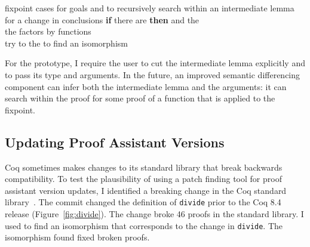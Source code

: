 \begin{algorithm}
\footnotesize
\begin{algorithmic}[1]
    \STATE {} fixpoint cases for goals
    \STATE {} and  to recursively search within an intermediate lemma for a change in conclusions
    \STATE \textbf{if} there are  \textbf{then}
    \STATE \hspace*{1em}  and  the  \\
           \hspace*{1em}  the factors by functions \\
           \hspace*{1em} try to  the  to find an isomorphism 
\end{algorithmic}
\end{algorithm}

For the prototype, I require the user to cut the intermediate lemma explicitly and to 
pass its type and arguments.
In the future, an improved semantic differencing component
can infer both the intermediate lemma and the arguments: it can search
within the proof for some proof of a function that is applied
to the fixpoint.

\begin{figure*}
\begin{minipage}{0.48\textwidth}

\end{minipage}
\hfill
\begin{minipage}{0.48\textwidth}

\end{minipage}
\caption[Caption for LOF]{Old (left) and new (right) definitions of \lstinline{divide} in Coq.}
\label{fig:divide}
\end{figure*}

\subsection{Updating Proof Assistant Versions}
\label{sec:coq}

Coq sometimes makes changes to its standard library that break
backwards compatibility.
To test the plausibility of using a patch finding tool for proof assistant version updates,
I identified a breaking change in the Coq standard library~\cite{coq84commit}.
The commit changed the definition of \lstinline{divide} prior to the Coq 8.4 release (Figure~\ref{fig:divide}).
The change broke 46 proofs in the standard library.
I used \sysname to find an isomorphism that corresponds to the change in \lstinline{divide}.
The isomorphism \sysname found fixed broken proofs.

